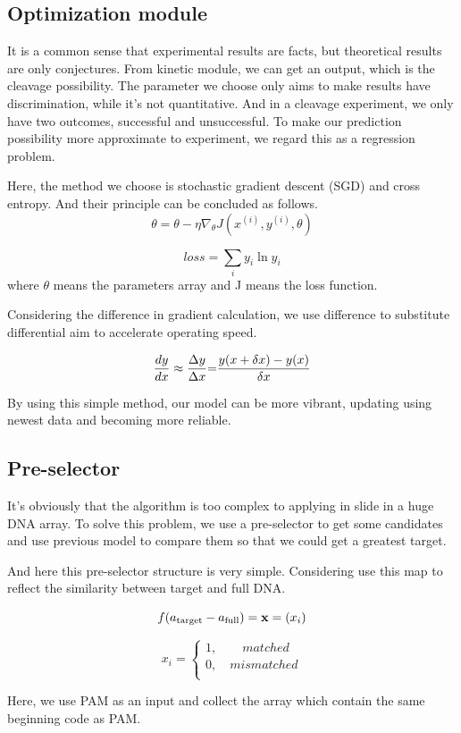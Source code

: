 \subsection{Optimization module}
It is a common sense that experimental results are facts, but theoretical results are only conjectures. From kinetic module, we can get an output, which is the cleavage possibility. The parameter we choose only aims to make results have discrimination, while it’s not quantitative. And in a cleavage experiment, we only have two outcomes, successful and unsuccessful. To make our prediction possibility more approximate to experiment, we regard this as a regression problem.

Here, the method we choose is stochastic gradient descent (SGD) and cross entropy. And their principle can be concluded as follows.
\begin{equation}
\theta  = \theta  - \eta {\nabla _\theta }J({x^{(i)}},{y^{(i)}},\theta )
\end{equation}
	
\begin{equation}
loss = \sum\limits_i {{y_i}\ln {y_i}}
\end{equation}
where $\theta$ means the parameters array and J means the loss function. 

Considering the difference in gradient calculation, we use difference to substitute differential aim to accelerate operating speed.\par
\begin{equation}
\frac{{dy}}{{dx}} \approx \frac{{\Delta y}}{{\Delta x}}{\rm{ = }}\frac{{y(x + \delta x) - y(x)}}{{\delta x}}
\end{equation}

By using this simple method, our model can be more vibrant, updating using newest data and becoming more reliable.

\subsection{Pre-selector}
It’s obviously that the algorithm is too complex to applying in slide in a huge DNA array. To solve this problem, we use a pre-selector to get some candidates and use previous model to compare them so that we could get a greatest target.\par
And here this pre-selector structure is very simple.
Considering use this map to reflect the similarity between target and full DNA.

\begin{equation}
f({a_{{\rm{target}}}} - {a_{{\rm{full}}}}) = {\bf{x}} = ({x_i})
\end{equation}

\begin{equation}{x_i} = \left\{ {\begin{array}{*{20}{c}}
{1,\quad \quad matched}  \\
{0,\quad mismatched}  \\
\end{array}} \right.
\end{equation}

Here, we use PAM as an input and collect the array which contain the same beginning code as PAM.

